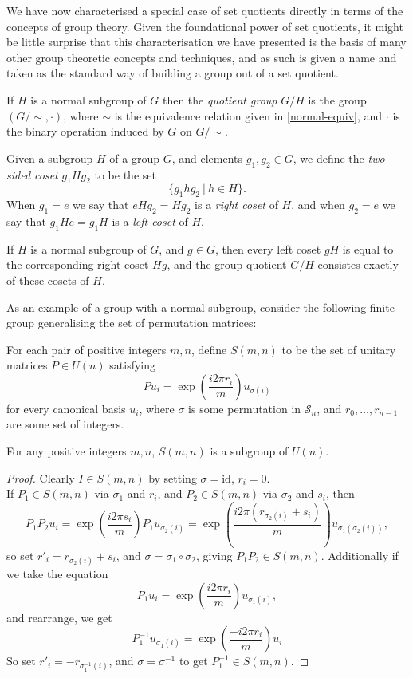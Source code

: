 We have now characterised a special case of set quotients directly in terms of the concepts of group theory. Given the foundational power of set quotients, it might be little surprise that this characterisation we have presented is the basis of many other group theoretic concepts and techniques, and as such is given a name and taken as the standard way of building a group out of a set quotient.
\begin{define}
	If $H$ is a normal subgroup of $G$ then the \emph{quotient group} $G/H$ is the group $(G/\sim, \cdot)$, where $\sim$ is the equivalence relation given in \autoref{normal-equiv}, and $\cdot$ is the binary operation induced by $G$ on $G/\sim$.
\end{define}

\begin{define}[Cosets]
	Given a subgroup $H$ of a group $G$, and elements $g_1, g_2 \in G$, we define the \emph{two-sided coset} $g_1Hg_2$ to be the set
	\[\{g_1hg_2\ |\ h \in H\}.\]
	When $g_1 = e$ we say that $eHg_2 = Hg_2$ is a \emph{right coset} of $H$, and when $g_2 = e$ we say that $g_1He = g_1H$ is a \emph{left coset} of $H$.
\end{define}

\begin{prop}
	If $H$ is a normal subgroup of $G$, and $g \in G$, then every left coset $gH$ is equal to the corresponding right coset $Hg$, and the group quotient $G/H$ consistes exactly of these cosets of $H$.
\end{prop}

As an example of a group with a normal subgroup, consider the following finite group generalising the set of permutation matrices:
\begin{define}\label{generalised-perm}
	For each pair of positive integers $m, n$, define $S(m, n)$ to be the set of unitary matrices $P\in U(n)$ satisfying
	\[Pu_i = \exp\left(\frac{i2\pi r_i}{m}\right)u_{\sigma(i)}\]
	for every canonical basis $u_i$, where $\sigma$ is some permutation in $\mathcal{S}_n$, and $r_0,\dots,r_{n-1}$ are some set of integers.
\end{define}

\begin{prop}
	For any positive integers $m, n$, $S(m, n)$ is a subgroup of $U(n)$.
\end{prop}
\begin{proof}
	Clearly $I \in S(m, n)$ by setting $\sigma = \text{id}$, $r_i = 0$.
	\\If $P_1 \in S(m, n)$ via $\sigma_1$ and $r_i$, and $P_2 \in S(m, n)$ via $\sigma_2$ and $s_i$, then
	\[P_1P_2u_i = \exp\left(\frac{i2\pi s_i}{m}\right)P_1u_{\sigma_2(i)} = \exp\left(\frac{i2\pi (r_{\sigma_2(i)} + s_i)}{m}\right)u_{\sigma_1(\sigma_2(i))},\]
	so set $r'_i = r_{\sigma_2(i)} + s_i$, and $\sigma = \sigma_1 \circ \sigma_2$, giving $P_1P_2 \in S(m, n)$. Additionally if we take the equation
	\[P_1u_i = \exp\left(\frac{i2\pi r_i}{m}\right)u_{\sigma_1(i)},\]
	and rearrange, we get
	\[P_1^{-1}u_{\sigma_1(i)} = \exp\left(\frac{-i2\pi r_i}{m}\right)u_i\]
	So set $r'_i = -r_{\sigma^{-1}_1(i)}$, and $\sigma = \sigma_1^{-1}$ to get $P_1^{-1} \in S(m, n)$.
\end{proof}

